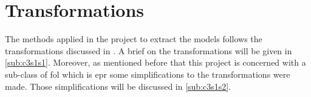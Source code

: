 \section{Transformations}\label{sec:c3s1}
The methods applied in the project to extract the models follows the transformations discussed in \cite{BMUG06}. A brief on the transformations will be given in \ref{sub:c3s1s1}.
Moreover, as mentioned before that this project is concerned with a sub-class of \ac{fol} which is \ac{epr} some simplifications to the transformations were made. Those simplifications will be discussed in \ref{sub:c3s1s2}.

	
	
	